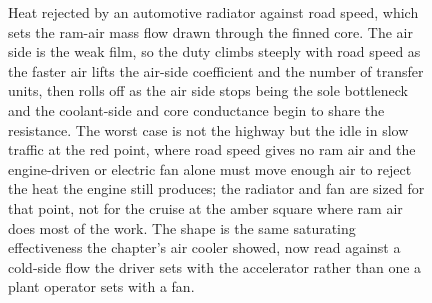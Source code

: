 \begin{figure}[htbp]
\centering
{}
\caption[Automotive radiator heat rejection against road speed]{Heat rejected by an
automotive radiator against road speed, which sets the ram-air mass flow drawn
through the finned core. The air side is the weak film, so the duty climbs steeply
with road speed as the faster air lifts the air-side coefficient and the number of
transfer units, then rolls off as the air side stops being the sole bottleneck and
the coolant-side and core conductance begin to share the resistance. The worst case
is not the highway but the idle in slow traffic at the red point, where road speed
gives no ram air and the engine-driven or electric fan alone must move enough air to
reject the heat the engine still produces; the radiator and fan are sized for that
point, not for the cruise at the amber square where ram air does most of the work.
The shape is the same saturating effectiveness the chapter's air cooler showed, now
read against a cold-side flow the driver sets with the accelerator rather than one a
plant operator sets with a fan.}
\label{fig:vol04ch06:radiator-rating}
\end{figure}
